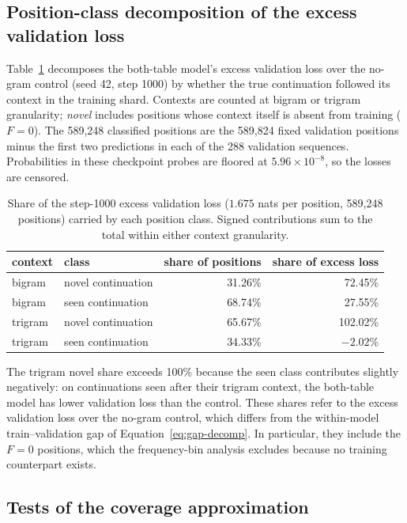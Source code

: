 \subsection{Position-class decomposition of the excess validation loss}
\label{app:novel-share}

Table~\ref{tab:novel-share} decomposes the both-table model's excess validation loss over the no-gram control (seed 42, step 1000) by whether the true continuation followed its context in the training shard. Contexts are counted at bigram or trigram granularity; \emph{novel} includes positions whose context itself is absent from training ($F=0$). The 589,248 classified positions are the 589,824 fixed validation positions minus the first two predictions in each of the 288 validation sequences. Probabilities in these checkpoint probes are floored at $5.96\times10^{-8}$, so the losses are censored.

\begin{table}[!htbp]
\centering\small
\caption{Share of the step-1000 excess validation loss ($1.675$ nats per position, 589{,}248 positions) carried by each position class. Signed contributions sum to the total within either context granularity.}
\label{tab:novel-share}
\begin{tabular}{llrr}
\toprule
context & class & share of positions & share of excess loss \\
\midrule
bigram & novel continuation & 31.26\% & 72.45\% \\
bigram & seen continuation & 68.74\% & 27.55\% \\
trigram & novel continuation & 65.67\% & 102.02\% \\
trigram & seen continuation & 34.33\% & $-2.02$\% \\
\bottomrule
\end{tabular}
\end{table}

The trigram novel share exceeds 100\% because the seen class contributes slightly negatively: on continuations seen after their trigram context, the both-table model has lower validation loss than the control. These shares refer to the excess validation loss over the no-gram control, which differs from the within-model train--validation gap of Equation~\eqref{eq:gap-decomp}. In particular, they include the $F=0$ positions, which the frequency-bin analysis excludes because no training counterpart exists.

\subsection{Tests of the coverage approximation}
\label{app:coverage-tests}
\label{app:gt-fits}
